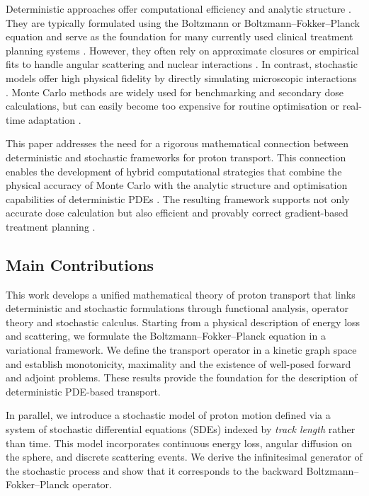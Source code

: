 \documentclass{amsart}
\theoremstyle{plain}
\begin{document}
Deterministic approaches offer computational efficiency and analytic
structure \cite{ashby2025efficient}. They are typically formulated
using the Boltzmann or Boltzmann--Fokker--Planck equation and serve as
the foundation for many currently used clinical treatment planning
systems \cite{lin2017benchmarking}. However, they often rely on approximate
closures or empirical fits to handle angular scattering and nuclear
interactions \cite{pomraning1992fokker}. In contrast, stochastic
models offer high physical fidelity by directly simulating microscopic
interactions \cite{haghighat2020monte,lux2018monte}. Monte Carlo
methods are widely used for benchmarking and secondary dose
calculations, but can easily become too expensive for routine
optimisation or real-time adaptation
\cite{unkelbach2018robust,fredriksson2012characterization}.

This paper addresses the need for a rigorous mathematical connection
between deterministic and stochastic frameworks for proton
transport. This connection enables the development of hybrid
computational strategies that combine the physical accuracy of Monte
Carlo with the analytic structure and optimisation capabilities of
deterministic PDEs \cite{roos2008robust}. The resulting framework
supports not only accurate dose calculation but also efficient and
provably correct gradient-based treatment planning
\cite{paganetti2025proton}.

\subsection{Main Contributions}

This work develops a unified mathematical theory of proton transport
that links deterministic and stochastic formulations through
functional analysis, operator theory and stochastic calculus. Starting
from a physical description of energy loss and scattering, we
formulate the Boltzmann--Fokker--Planck equation in a variational
framework. We define the transport operator in a kinetic graph space
and establish monotonicity, maximality and the existence of well-posed
forward and adjoint problems. These results provide the foundation for
the description of deterministic PDE-based transport.

In parallel, we introduce a stochastic model of proton motion defined
via a system of stochastic differential equations (SDEs) indexed by
\emph{track length} rather than time. This model incorporates
continuous energy loss, angular diffusion on the sphere, and discrete
scattering events. We derive the infinitesimal generator of the
stochastic process and show that it corresponds to the backward
Boltzmann--Fokker--Planck operator.
\end{document}
